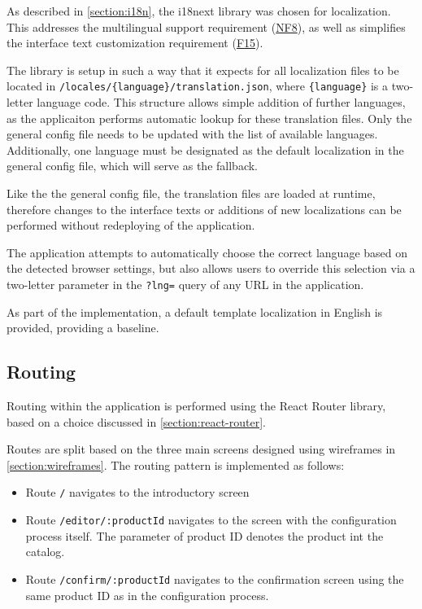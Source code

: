 As described in \autoref{section:i18n}, the i18next library was chosen for localization. This addresses the multilingual support requirement (\hyperref[itm:NF8]{NF8}), as well as simplifies the interface text customization requirement (\hyperref[itm:F15]{F15}).

The library is setup in such a way that it expects for all localization files to be located in \texttt{/locales/\{language\}/translation.json}, where \texttt{\{language\}} is a two-letter language code. This structure allows simple addition of further languages, as the applicaiton performs automatic lookup for these translation files. Only the general config file needs to be updated with the list of available languages. Additionally, one language must be designated as the default localization in the general config file, which will serve as the fallback.

Like the the general config file, the translation files are loaded at runtime, therefore changes to the interface texts or additions of new localizations can be performed without redeploying of the application.

The application attempts to automatically choose the correct language based on the detected browser settings, but also allows users to override this selection via a two-letter parameter in the \texttt{?lng=} query of any URL in the application.  

As part of the implementation, a default template localization in English is provided, providing a baseline.


\subsection{Routing}

Routing within the application is performed using the React Router library, based on a choice discussed in \autoref{section:react-router}.

Routes are split based on the three main screens designed using wireframes in \autoref{section:wireframes}. The routing pattern is implemented as follows:

\begin{itemize}[label=\rectanglebullet]
    \item Route \texttt{/} navigates to the introductory screen
    \item Route \texttt{/editor/:productId} navigates to the screen with the configuration process itself. The parameter of product ID denotes the product int the catalog.
    \item Route \texttt{/confirm/:productId} navigates to the confirmation screen using the same product ID as in the configuration process.
\end{itemize}

